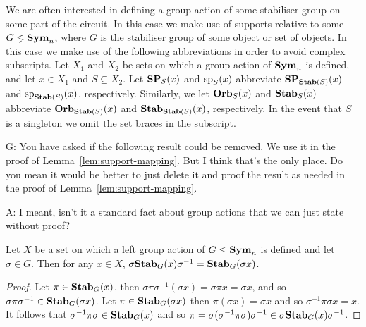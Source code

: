 \documentclass[../paper.tex]{subfiles}
\begin{document}
We are often interested in defining a group action of some stabiliser group on
some part of the circuit. In this case we make use of supports relative to some
$G \lneq \text{\textbf{Sym}}_n$, where $G$ is the stabiliser group of some object or set of
objects. In this case we make use of the following abbreviations in order to
avoid complex subscripts. Let $X_1$ and $X_2$ be sets on which a group action of
$\text{\textbf{Sym}}_n$ is defined, and let $x \in X_1$ and $S \subseteq X_2$. Let $\text{\textbf{SP}}_S(x)$
and $\text{sp}_S(x)$ abbreviate $\text{\textbf{SP}}_{\text{\textbf{Stab}}(S)}(x)$ and $\text{sp}_{\text{\textbf{Stab}}(S)}(x)$,
respectively. Similarly, we let $\text{\textbf{Orb}}_S(x)$ and $\text{\textbf{Stab}}_S(x)$ abbreviate
$\text{\textbf{Orb}}_{\text{\textbf{Stab}}(S)}(x)$ and $\text{\textbf{Stab}}_{\text{\textbf{Stab}}(S)}(x)$, respectively. In the event that
$S$ is a singleton we omit the set braces in the subscript.


\begin{remark}
  G: You have asked if the following result could be removed. We use it in the
  proof of Lemma~\ref{lem:support-mapping}. But I think that's the only place.
  Do you mean it would be better to just delete it and proof the result as
  needed in the proof of Lemma~\ref{lem:support-mapping}.

A: I meant, isn't it a standard fact about group actions that we can
just state without proof?
\end{remark}

\begin{lem}
  \label{lem:stab-conjugation}
  Let $X$ be a set on which a left group action of $G \leq \text{\textbf{Sym}}_n$ is defined
  and let $\sigma \in G$. Then for any $x \in X$, $\sigma \text{\textbf{Stab}}_G (x)
  \sigma^{-1} = \text{\textbf{Stab}}_G(\sigma x)$.
\end{lem}

\begin{proof}
  Let $\pi \in \text{\textbf{Stab}}_G(x)$, then $\sigma \pi \sigma^{-1}(\sigma x) = \sigma \pi
  x = \sigma x$, and so $\sigma \pi \sigma^{-1} \in \text{\textbf{Stab}}_G(\sigma x)$. Let $\pi
  \in \text{\textbf{Stab}}_G(\sigma x)$ then $\pi (\sigma x) = \sigma x$ and so $\sigma^{-1}
  \pi \sigma x = x$. It follows that $\sigma^{-1} \pi \sigma \in \text{\textbf{Stab}}_G(x)$ and
  so $\pi = \sigma (\sigma^{-1} \pi \sigma) \sigma ^{-1} \in \sigma \text{\textbf{Stab}}_G(x)
  \sigma^{-1}$.
\end{proof}
\end{document}
